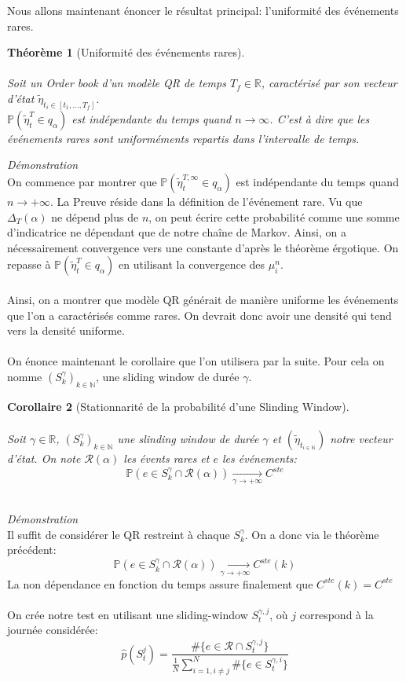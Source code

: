 \documentclass[12pt,a4paper]{article}
\newtheorem{theorem}{Théorème}[section]
\newtheorem{corollary}[theorem]{Corollaire}
\theoremstyle{definition}
\theoremstyle{remark}
\begin{document}
Nous allons maintenant énoncer le résultat principal: l'uniformité des événements rares.
\\
\begin{theorem}[Uniformité des événements rares]
\\
\\
Soit un Order book d'un modèle QR de temps $T_f\in \mathbb{R}$, caractérisé par son vecteur d'état $\tilde \eta_{t_i\in [t_1,\dots,T_f]}$.
\\
$\mathbb{P}\left(\tilde\eta_t^T\in q_{\alpha}\right)$ est indépendante du temps quand $n\to\infty$. C'est à dire que les événements rares sont uniforméments repartis dans l'intervalle de temps.

\end{theorem}
\textit{Démonstration} 
\\
On commence par montrer que $\mathbb{P}\left(\tilde\eta_t^{T,\infty}\in q_{\alpha}\right)$ est indépendante du temps quand $n\to+\infty$. La Preuve réside dans la définition de l'événement rare. Vu que $\Delta_T(\alpha)$ ne dépend plus de $n$, on peut écrire cette probabilité comme une somme d'indicatrice ne dépendant que de notre chaîne de Markov. Ainsi, on a nécessairement convergence vers une constante d'après le théorème érgotique. On repasse à $\mathbb{P}\left(\tilde\eta_t^T\in q_{\alpha}\right)$ en utilisant la convergence des $\mu_i^n$.
\\
\\
Ainsi, on a montrer que modèle QR générait de manière uniforme les événements que l'on a caractérisés comme rares. On devrait donc avoir une densité qui tend vers la densité uniforme. 
\\
\\
On énonce maintenant le corollaire que l'on utilisera par la suite. Pour cela on nomme $(S^\gamma_{k})_{k\in \mathbb{N}}$, une sliding window de durée $\gamma$.
\begin{corollary}[Stationnarité de la probabilité d'une Slinding Window] 
\\
\\
Soit $\gamma \in \mathbb{R}$, $(S^\gamma_{k})_{k\in \mathbb{N}}$ une slinding window de durée $\gamma$ et $(\tilde\eta_{t_{i\in \mathbb{N}}})$ notre vecteur d'état. On note $\mathcal{R}(\alpha)$ les évents rares et $e$ les événements:
$$\mathbb{P}\left(e\in S^{\gamma}_k \cap \mathcal{R}(\alpha)\right)\underset{\gamma\to+\infty}{\to}C^{ste}$$
\end{corollary}
\\
\textit{Démonstration} 
\\Il suffit de considérer le QR restreint à chaque $S^{\gamma}_k$. On a donc via le théorème précédent:
$$\mathbb{P}\left(e\in S^{\gamma}_k \cap \mathcal{R}(\alpha)\right)\underset{\gamma\to+\infty}{\to}C^{ste}(k)$$
La non dépendance en fonction du temps assure finalement que $C^{ste}(k) = C^{ste}$
\\
\\
On crée notre test en utilisant une sliding-window $S_t^{\gamma,j}$, où $j$ correspond à la journée considérée:
$$\hat p(S_t^j) = \frac{\#\{e\in \mathcal{R}\cap S_t^{\gamma,j}\}}{\frac{1}{N}\sum_{i=1,i\neq j}^N\#\{e\in S_t^{\gamma,i}\}}$$
\end{document}
